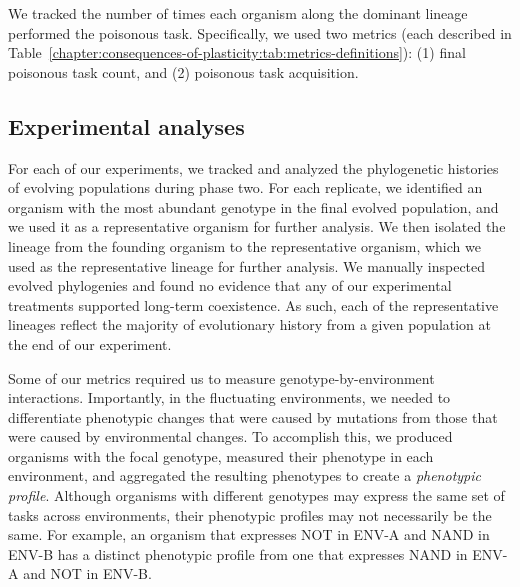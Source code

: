 We tracked the number of times each organism along the dominant lineage performed the poisonous task.
Specifically, we used two metrics (each described in Table~\ref{chapter:consequences-of-plasticity:tab:metrics-definitions}):
(1) final poisonous task count,
and (2) poisonous task acquisition.

\subsection{Experimental analyses}




For each of our experiments, we tracked and analyzed the phylogenetic histories of evolving populations during phase two. 
For each replicate, we identified an organism with the most abundant genotype in the final evolved population, and we used it as a representative organism for further analysis.
We then isolated the lineage from the founding organism to the representative organism, which we used as the representative lineage for further analysis.
We manually inspected evolved phylogenies and found no evidence that any of our experimental treatments supported long-term coexistence. 
As such, each of the representative lineages reflect the majority of evolutionary history from a given population at the end of our experiment.

Some of our metrics required us to measure genotype-by-environment interactions.
Importantly, in the fluctuating environments, we needed to differentiate phenotypic changes that were caused by mutations from those that were caused by environmental changes.
To accomplish this, we produced organisms with the focal genotype, measured their phenotype in each environment, and aggregated the resulting phenotypes to create a \textit{phenotypic profile}. 
Although organisms with different genotypes may express the same set of tasks across environments, their phenotypic profiles may not necessarily be the same.
For example, an organism that expresses NOT in ENV-A and NAND in ENV-B has a distinct phenotypic profile from one that expresses NAND in ENV-A and NOT in ENV-B.


